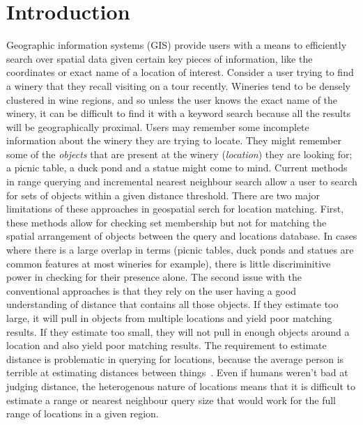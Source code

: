 \section{Introduction}
\label{section:introduction}
Geographic information systems (GIS) provide users with a means to efficiently search over spatial data given certain key pieces of information, like the coordinates or exact name of a location of interest. 
Consider a user trying to find a winery that they recall visiting on a tour recently.
Wineries tend to be densely clustered in wine regions, and so unless the user knows the exact name of the winery, it can be difficult to find it with a keyword search because all the results will be geographically proximal.
Users may remember some incomplete information about the winery they are trying to locate. 
They might remember some of the \textit{objects} that are present at the winery (\textit{location}) they are looking for; a picnic table, a duck pond and a statue might come to mind.
Current methods in range querying and incremental nearest neighbour search allow a user to search for sets of objects within a given distance threshold. 
There are two major limitations of these approaches in geospatial serch for location matching. 
First, these methods allow for checking set membership but not for matching the spatial arrangement of objects between the query and locations database. 
In cases where there is a large overlap in terms (picnic tables, duck ponds and statues are common features at most wineries for example), there is little discriminitive power in checking for their presence alone. 
The second issue with the conventional approaches is that they rely on the user having a good understanding of distance that contains all those objects. 
If they estimate too large, it will pull in objects from multiple locations and yield poor matching results. 
If they estimate too small, they will not pull in enough objects around a location and also yield poor matching results. 
The requirement to estimate distance is problematic in querying for locations, because the average person is terrible at estimating distances between things~\cite{Schwering2014}. 
Even if humans weren't bad at judging distance, the heterogenous nature of locations means that it is difficult to estimate a range or nearest neighbour query size that would work for the full range of locations in a given region. 
